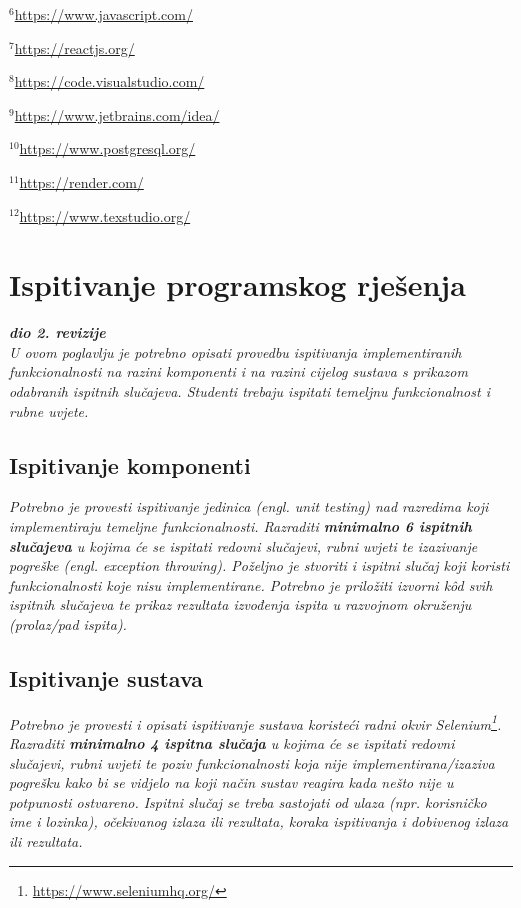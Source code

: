 			$^{6}$\url{https://www.javascript.com/}
			
			$^{7}$\url{https://reactjs.org/}
			
			$^{8}$\url{https://code.visualstudio.com/}
			
			$^{9}$\url{https://www.jetbrains.com/idea/}
			
			$^{10}$\url{https://www.postgresql.org/}
			
			$^{11}$\url{https://render.com/}
			
			$^{12}$\url{https://www.texstudio.org/}
			
			\eject 
		
	
		\section{Ispitivanje programskog rješenja}
			
			\textbf{\textit{dio 2. revizije}}\\
			
			 \textit{U ovom poglavlju je potrebno opisati provedbu ispitivanja implementiranih funkcionalnosti na razini komponenti i na razini cijelog sustava s prikazom odabranih ispitnih slučajeva. Studenti trebaju ispitati temeljnu funkcionalnost i rubne uvjete.}
	
			
			\subsection{Ispitivanje komponenti}
			\textit{Potrebno je provesti ispitivanje jedinica (engl. unit testing) nad razredima koji implementiraju temeljne funkcionalnosti. Razraditi \textbf{minimalno 6 ispitnih slučajeva} u kojima će se ispitati redovni slučajevi, rubni uvjeti te izazivanje pogreške (engl. exception throwing). Poželjno je stvoriti i ispitni slučaj koji koristi funkcionalnosti koje nisu implementirane. Potrebno je priložiti izvorni kôd svih ispitnih slučajeva te prikaz rezultata izvođenja ispita u razvojnom okruženju (prolaz/pad ispita). }
			
			
			
			\subsection{Ispitivanje sustava}
			
			 \textit{Potrebno je provesti i opisati ispitivanje sustava koristeći radni okvir Selenium\footnote{\url{https://www.seleniumhq.org/}}. Razraditi \textbf{minimalno 4 ispitna slučaja} u kojima će se ispitati redovni slučajevi, rubni uvjeti te poziv funkcionalnosti koja nije implementirana/izaziva pogrešku kako bi se vidjelo na koji način sustav reagira kada nešto nije u potpunosti ostvareno. Ispitni slučaj se treba sastojati od ulaza (npr. korisničko ime i lozinka), očekivanog izlaza ili rezultata, koraka ispitivanja i dobivenog izlaza ili rezultata.\\ }
			 
